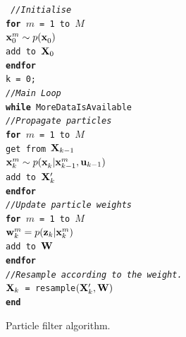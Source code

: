 \begin{figure}[h]
{ \tt %
\hspace*{.1cm} {\it //Initialise} \\
\hspace*{.1cm} {\bf for} $m$ = 1 to $M$ \\
\hspace*{.5cm}  $\x{0}{}{m} \sample{}{} p(\x{0}{}{})$\\
\hspace*{.5cm}  add  to ${\bf X}_0$\\
\hspace*{.1cm} {\bf endfor}\\
\hspace*{.1cm} k = 0; \\
\hspace*{.1cm} {\it //Main Loop} \\
\hspace*{.1cm} {\bf while} MoreDataIsAvailable \\
\hspace*{.5cm}   {\it //Propagate particles} \\
\hspace*{.5cm}   {\bf for} $m$ = 1 to $M$ \\
\hspace*{.9cm}      get  from ${\bf X}_{k-1}$\\
\hspace*{.9cm}      $\x{k}{}{m} \sample{}{} p(\x{k}{}{} 
                      |\x{k-1}{}{m}, \U{k-1})$\\
\hspace*{.9cm}      add  to ${\bf X}_k^\prime$\\
\hspace*{.5cm}   {\bf endfor}\\
\hspace*{.5cm}   {\it //Update particle weights}\\
\hspace*{.5cm}   {\bf for} $m$ = 1 to $M$ \\
\hspace*{.9cm}      $\w{k}{}{m} = p(\z{k} | \x{k}{}{m})$\\
\hspace*{.9cm}      add  to ${\bf W}$\\
\hspace*{.5cm}   {\bf endfor}\\
\hspace*{.5cm}   {\it //Resample according to the weight.}\\
\hspace*{.5cm}  ${\bf X}_k$ = resample$({\bf X}_k^\prime, {\bf W})$\\
\hspace*{.1cm} {\bf end}
}
\caption{Particle filter algorithm.}
\label{fig:pf_algorithm}
\end{figure}

